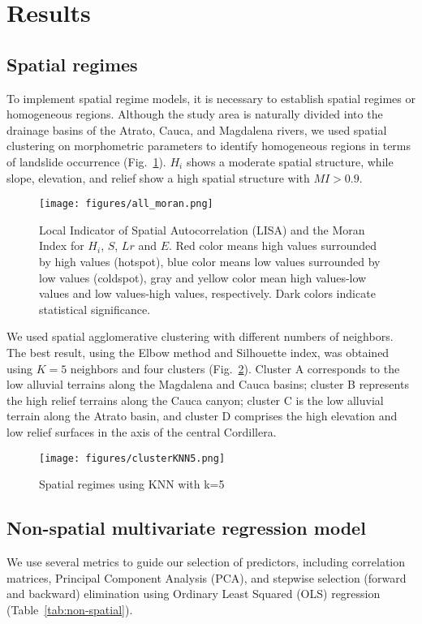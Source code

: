 \documentclass[
  manuscript=article,  
  layout=preprint,  
  year=2023,
  volume=0,
]{format}
\begin{document}
\section{Results}

\subsection{Spatial regimes}
\par To implement spatial regime models, it is necessary to establish spatial regimes or homogeneous regions. Although the study area is naturally divided into the drainage basins of the Atrato, Cauca, and Magdalena rivers, we used spatial clustering on morphometric parameters to identify homogeneous regions in terms of landslide occurrence (Fig.~\ref{fig:LISA}). $H_i$ shows a moderate spatial structure, while slope, elevation, and relief show a high spatial structure with $MI > 0.9$.

\begin{figure}[ht!]
    \centering
      {\texttt{[image: figures/all\_moran.png]}}
    \caption{Local Indicator of Spatial Autocorrelation (LISA) and the Moran Index for $H_i$, $S$, $Lr$ and $E$. Red color means high values surrounded by high values (hotspot), blue color means low values surrounded by low values (coldspot), gray and yellow color mean high values-low values and low values-high values, respectively. Dark colors indicate statistical significance.}
    \label{fig:LISA}
\end{figure}

\par We used spatial agglomerative clustering with different numbers of neighbors. The best result, using the Elbow method and Silhouette index, was obtained using $K=5$ neighbors and four clusters (Fig.~\ref{fig:cluster}). Cluster A corresponds to the low alluvial terrains along the Magdalena and Cauca basins; cluster B represents the high relief terrains along the Cauca canyon; cluster C is the low alluvial terrain along the Atrato basin, and cluster D comprises the high elevation and low relief surfaces in the axis of the central Cordillera.

 \begin{figure}[ht!]
    \centering
      {\texttt{[image: figures/clusterKNN5.png]}}
    \caption{Spatial regimes using KNN with k=5}
    \label{fig:cluster}
\end{figure}

\subsection{Non-spatial multivariate regression model}
\par We use several metrics to guide our selection of predictors, including correlation matrices, Principal Component Analysis (PCA), and stepwise selection (forward and backward) elimination using Ordinary Least Squared (OLS) regression (Table~\ref{tab:non-spatial}).
\end{document}
